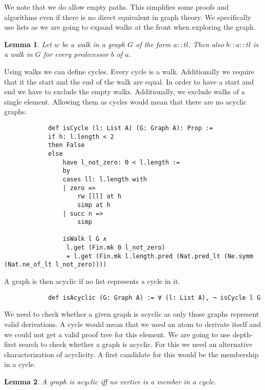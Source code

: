 \documentclass{article}
\newtheorem{lemma}{Lemma}
\begin{document}
        We note that we do allow empty paths. This simplifies some proofs and algorithms even if there is no direct equivalent in graph theory. We specifically use lists as we are going to expand walks at the front when exploring the graph.  
        
        \begin{lemma}
            Let $w$ be a walk in a graph $G$ of the form $a::tl$. Then also $b::a::tl$ is a walk in $G$ for every predecessor $b$ of $a$.
        \end{lemma}

        Using walks we can define cycles. Every cycle is a walk. Additionally we require that it the start and the end of the walk are equal. In order to have a start and end we have to exclude the empty walks. Additionally, we exclude walks of a single element. Allowing them as cycles would mean that there are no acyclic graphs.

        \begin{lstlisting}
            def isCycle (l: List A) (G: Graph A): Prop :=
            if h: l.length < 2
            then False
            else
                have l_not_zero: 0 < l.length :=
                by
                cases ll: l.length with
                | zero =>
                    rw [ll] at h
                    simp at h
                | succ n =>
                    simp

                isWalk l G ∧
                 l.get (Fin.mk 0 l_not_zero) 
                 = l.get (Fin.mk l.length.pred (Nat.pred_lt (Ne.symm (Nat.ne_of_lt l_not_zero))))
        \end{lstlisting}

        A graph is then acyclic if no list represents a cycle in it.

        \begin{lstlisting}
            def isAcyclic (G: Graph A) := ∀ (l: List A), ¬ isCycle l G
        \end{lstlisting}

        We need to check whether a given graph is acyclic as only those graphs represent valid derivations. A cycle would mean that we used an atom to derivate itself and we could not get a valid proof tree for this element. We are going to use depth-first search to check whether a graph is acyclic. For this we need an alternative characterization of acyclicity.
        A first candidate for this would be the membership in a cycle.

        \begin{lemma}
            A graph is acyclic iff no vertice is a member in a cycle.
        \end{lemma}
\end{document}

